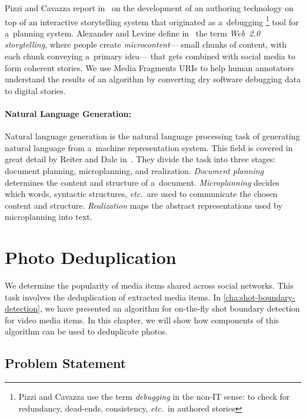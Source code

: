 Pizzi and Cavazza report in~\cite{pizzi2008debugging}
on the development of an authoring technology
on top of an interactive storytelling system
that originated as a~debugging%
\footnote{Pizzi and Cavazza use the term \emph{debugging}
in the non-IT sense: to check for redundancy, dead-ends, consistency, \emph{etc.}\ in
authored stories} tool for a~planning system.
Alexander and Levine define in~\cite{alexander2008storytelling}
the term \emph{Web~2.0 storytelling},
where people create \emph{microcontent}---%
small chunks of content, with each chunk conveying a~primary idea---%
that gets combined with social media to form coherent stories.
We use Media Fragments URIs to help human annotators
understand the results of an algorithm
by converting dry software debugging data to digital stories.

\paragraph{Natural Language Generation:}

Natural language generation is the natural language processing task
of generating natural language from a~machine representation system.
This field is covered in great detail by Reiter and Dale
in~\cite{reiter2000building}.
They divide the task into three stages:
document planning, microplanning, and realization.
\emph{Document planning} determines the content and structure of a~document.
\emph{Microplanning} decides which words, syntactic structures,
\emph{etc.}\ are used to communicate the chosen content and structure.
\emph{Realization} maps the abstract representations
used by microplanning into text.

\section{Photo Deduplication}
\label{sec:photo-deduplication}

We determine the popularity of media items
shared across social networks.
This task involves the deduplication of extracted media items.
In \autoref{cha:shot-boundary-detection}, we have presented an algorithm
for on-the-fly shot boundary detection for video media items.
In this chapter, we will show how components of this algorithm
can be used to deduplicate photos.

\subsection{Problem Statement}
\label{sec:problem-statement}

